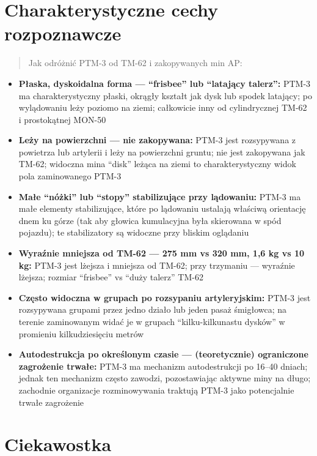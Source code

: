\documentclass[12pt,openany,oneside]{book}
\providecommand{\tightlist}{%
  \setlength{\itemsep}{0pt}\setlength{\parskip}{0pt}}
\begin{document}
\section{Charakterystyczne cechy
rozpoznawcze}\label{charakterystyczne-cechy-rozpoznawcze-116}

\begin{quote}
Jak odróżnić PTM-3 od TM-62 i zakopywanych min AP:
\end{quote}

\begin{itemize}
\tightlist
\item
  \textbf{Płaska, dyskoidalna forma --- ``frisbee'' lub ``latający
  talerz'':} PTM-3 ma charakterystyczny płaski, okrągły kształt jak dysk
  lub spodek latający; po wylądowaniu leży poziomo na ziemi; całkowicie
  inny od cylindrycznej TM-62 i prostokątnej MON-50
\item
  \textbf{Leży na powierzchni --- nie zakopywana:} PTM-3 jest
  rozsypywana z powietrza lub artylerii i leży na powierzchni gruntu;
  nie jest zakopywana jak TM-62; widoczna mina ``disk'' leżąca na ziemi
  to charakterystyczny widok pola zaminowanego PTM-3
\item
  \textbf{Małe ``nóżki'' lub ``stopy'' stabilizujące przy lądowaniu:}
  PTM-3 ma małe elementy stabilizujące, które po lądowaniu ustalają
  właściwą orientację dnem ku górze (tak aby głowica kumulacyjna była
  skierowana w spód pojazdu); te stabilizatory są widoczne przy bliskim
  oglądaniu
\item
  \textbf{Wyraźnie mniejsza od TM-62 --- 275 mm vs 320 mm, 1,6 kg vs 10
  kg:} PTM-3 jest lżejsza i mniejsza od TM-62; przy trzymaniu ---
  wyraźnie lżejsza; rozmiar ``frisbee'' vs ``duży talerz'' TM-62
\item
  \textbf{Często widoczna w grupach po rozsypaniu artyleryjskim:} PTM-3
  jest rozsypywana grupami przez jedno działo lub jeden pasaż śmigłowca;
  na terenie zaminowanym widać je w grupach ``kilku-kilkunastu dysków''
  w promieniu kilkudziesięciu metrów
\item
  \textbf{Autodestrukcja po określonym czasie --- (teoretycznie)
  ograniczone zagrożenie trwałe:} PTM-3 ma mechanizm autodestrukcji po
  16--40 dniach; jednak ten mechanizm często zawodzi, pozostawiając
  aktywne miny na długo; zachodnie organizacje rozminowywania traktują
  PTM-3 jako potencjalnie trwałe zagrożenie
\end{itemize}

\section{Ciekawostka}\label{ciekawostka-116}
\end{document}
